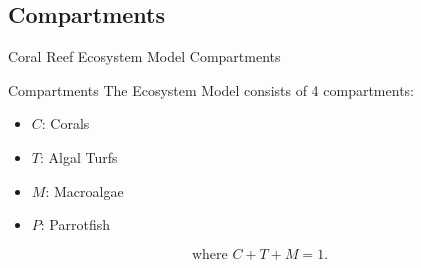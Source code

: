 \documentclass{beamer}
\begin{document}
\subsection{Compartments}
\begin{frame}{Coral Reef Ecosystem Model Compartments}
    \begin{block}{Compartments}
    The Ecosystem Model consists of 4 compartments:
        \begin{itemize}
        \item \small{$C$: Corals}
        \item \small{$T$: Algal Turfs}
        \item \small{$M$: Macroalgae}
        \item \small{$P$: Parrotfish}
        \end{itemize}
        $$ \text{where } C + T + M = 1.$$
    \end{block}
\end{frame}
\end{document}
